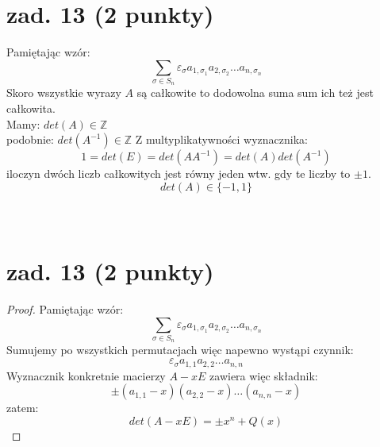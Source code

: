 \documentclass{article}
\begin{document}
\section{zad. 13 (2 punkty)}
Pamiętając wzór:
$$
\sum_{\sigma \in S_n} {\varepsilon}_{\sigma} a_{1,{\sigma}_1} a_{2,{\sigma}_2} \dots a_{n,{\sigma}_n}
$$
Skoro wszystkie wyrazy $A$ są całkowite to dodowolna suma sum ich też jest całkowita.\\
Mamy: $det(A) \in \mathbb{Z}$\\
podobnie: $det(A^{-1}) \in \mathbb{Z}$
Z multyplikatywności wyznacznika:
$$
1 = det(E) = det(AA^{-1}) = det(A)det(A^{-1})
$$
iloczyn dwóch liczb całkowitych jest równy jeden wtw. gdy te liczby to $\pm 1$.\\
$$
det(A) \in \{-1,1\}
$$
\\\\
\section{zad. 13 (2 punkty)}
\begin{proof}
Pamiętając wzór:
$$
\sum_{\sigma \in S_n} {\varepsilon}_{\sigma} a_{1,{\sigma}_1} a_{2,{\sigma}_2} \dots a_{n,{\sigma}_n}
$$
Sumujemy po wszystkich permutacjach więc napewno wystąpi czynnik:
$$
{\varepsilon}_{\sigma} a_{1,1} a_{2,2} \dots a_{n,n}
$$
Wyznacznik konkretnie macierzy $A-xE$ zawiera więc składnik:
$$
\pm (a_{1,1}-x)(a_{2,2}-x) \dots (a_{n,n}-x)
$$
zatem:
$$
det(A-xE) = \pm x^n + Q(x)
$$
\end{proof}
\end{document}
